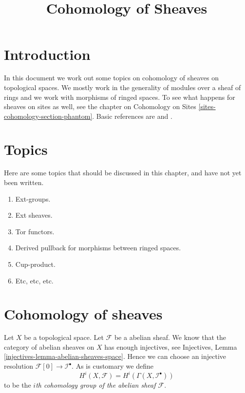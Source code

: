 

%


\title{Cohomology of Sheaves}


\maketitle

\label{section-phantom}

\tableofcontents

\section{Introduction}
\label{section-introduction}

\noindent
In this document we work out some topics on cohomology of sheaves
on topological spaces. We mostly work in the generality of modules
over a sheaf of rings and we work with morphisms of ringed spaces.
To see what happens for sheaves on sites as well, 
see the chapter on Cohomology on Sites \ref{sites-cohomology-section-phantom}.
Basic references are \cite{Godement} and \cite{Iversen}.



\section{Topics}
\label{section-topics}

\noindent
Here are some topics that should be discussed in this chapter,
and have not yet been written.
\begin{enumerate}
\item Ext-groups.
\item Ext sheaves.
\item Tor functors.
\item Derived pullback for morphisms between ringed spaces.
\item Cup-product.
\item Etc, etc, etc.
\end{enumerate}



\section{Cohomology of sheaves}
\label{section-cohomology-sheaves}

\noindent
Let $X$ be a topological space.
Let $\mathcal{F}$ be a abelian sheaf.
We know that the category of abelian sheaves on $X$ has enough injectives,
see Injectives, Lemma \ref{injectives-lemma-abelian-sheaves-space}.
Hence we can choose an injective resolution
$\mathcal{F}[0] \to \mathcal{I}^\bullet$.
As is customary we define
$$
H^i(X, \mathcal{F}) = H^i(\Gamma(X, \mathcal{I}^\bullet))
$$
to be the {\it $i$th cohomology group of the abelian sheaf $\mathcal{F}$}.

